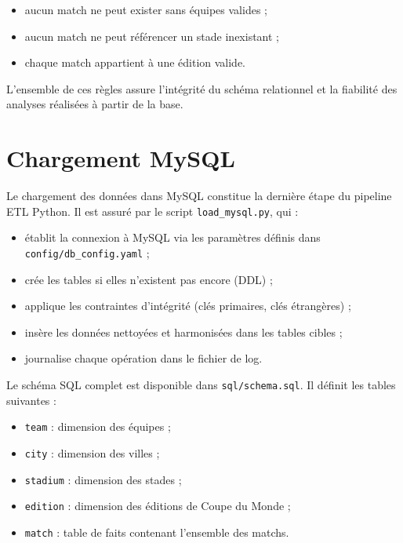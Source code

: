 \documentclass[12pt,a4paper]{article}
\begin{document}
\begin{itemize}
    \item aucun match ne peut exister sans équipes valides ;
    \item aucun match ne peut référencer un stade inexistant ;
    \item chaque match appartient à une édition valide.
\end{itemize}

L’ensemble de ces règles assure l’intégrité du schéma relationnel et la fiabilité des analyses réalisées à partir de la base.

\newpage
\section{Chargement MySQL}

Le chargement des données dans MySQL constitue la dernière étape du pipeline ETL Python.  
Il est assuré par le script \texttt{load\_mysql.py}, qui :

\begin{itemize}
    \item établit la connexion à MySQL via les paramètres définis dans \texttt{config/db\_config.yaml} ;
    \item crée les tables si elles n'existent pas encore (DDL) ;
    \item applique les contraintes d'intégrité (clés primaires, clés étrangères) ;
    \item insère les données nettoyées et harmonisées dans les tables cibles ;
    \item journalise chaque opération dans le fichier de log.
\end{itemize}

Le schéma SQL complet est disponible dans \texttt{sql/schema.sql}.  
Il définit les tables suivantes :

\begin{itemize}
    \item \texttt{team} : dimension des équipes ;
    \item \texttt{city} : dimension des villes ;
    \item \texttt{stadium} : dimension des stades ;
    \item \texttt{edition} : dimension des éditions de Coupe du Monde ;
    \item \texttt{match} : table de faits contenant l’ensemble des matchs.
\end{itemize}
\end{document}
